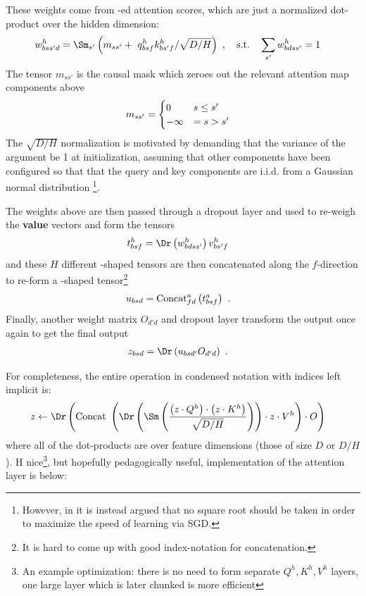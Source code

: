 \documentclass[11pt]{article}
\begin{document}
 These weights come from -ed attention scores, which are just a normalized
 dot-product over the hidden dimension:
\begin{align}
    w ^{ h }_{ bss'd } &=\Sm _{ s' } \left (m _{ s s' }+\ q ^{ h }_{ bsf }k ^{ h }_{ bs'f } / \sqrt{D/H} \right
        )\ ,  \quad {\rm s.t.} \quad \sum_{s'}w ^{ h }_{ bdss' } =1
\end{align}
The tensor $ m _{  s s' } $ is the causal mask which zeroes out the relevant attention map
components above
\begin{align}
    m _{ s s' } &= \begin{cases}
            0 & s \le s' \nonumber\\
            -\infty &= s > s'
        \end{cases}
\end{align}
The $ \sqrt{D/H} $ normalization is motivated by demanding
that the variance of the  argument be 1 at initialization, assuming that other
components have been configured so that that the query and key components are i.i.d. from a Gaussian
normal distribution \footnote{However, in \cite{yang2022tensor} it is instead argued that no square
root should be taken in order to maximize the speed of learning via SGD.}.

The weights above are then passed through a dropout layer and used to re-weigh the \textbf{value} vectors and form the tensors
\begin{align}
  t ^{ h }_{ bsf }&=\Dr  \left (w ^{ h }_{ bdss' } \right ) v ^{ h }_{ bs'f }
\end{align}
and these $ H $ different -shaped tensors
are then concatenated along the $ f $-direction to re-form a -shaped
tensor\footnote{It is hard to come up with good index-notation for concatenation.}
\begin{align}
    u _{ bsd } &= {\rm Concat}^{ a }_{ fd } \left ( t ^{ a }_{ bsf }\right )\ .
\end{align}
Finally, another weight matrix $ O _{d' d } $ and dropout layer transform the output once again to get the final
output
\begin{align}
  z _{ bsd } &= \Dr \left (u  _{ bsd' } O _{ d'd }\right )\ .
\end{align}

For completeness, the entire operation in condensed notation with indices left implicit is:
\begin{align}
    z  &\leftarrow \Dr \left ({\rm Concat} \ \left ( \Dr \left (\Sm  \left ( \frac{ \left ( z \cdot Q ^{ h } \right )\cdot \left ( z \cdot K ^{ h } \right )}{ \sqrt{D/H} }
            \right)\right )\cdot z \cdot V ^{ h } \right ) \cdot O \right )
\end{align}
where all of the dot-products are over feature dimensions (those of size $ D $ or $ D/H $).
H nice\footnote{An example optimization: there is no need to form separate $ Q ^{ h },K ^{ h },V ^{
h} $  layers, one large layer which is later chunked is more efficient}, but
hopefully pedagogically useful, implementation of the attention layer is below:
\end{document}
